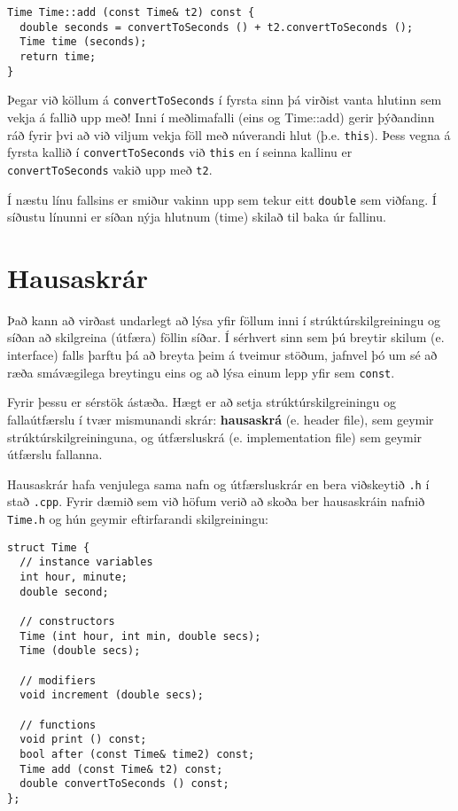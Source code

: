 \begin{verbatim}
Time Time::add (const Time& t2) const {
  double seconds = convertToSeconds () + t2.convertToSeconds ();
  Time time (seconds);
  return time;
}
\end{verbatim}
%
Þegar við köllum á {\tt convertToSeconds} í fyrsta sinn þá virðist vanta hlutinn sem vekja á fallið upp með!
Inni í meðlimafalli (eins og Time::add) gerir þýðandinn ráð fyrir þvi að við viljum vekja föll með núverandi hlut (þ.e. {\tt this}). 
Þess vegna á fyrsta kallið í {\tt convertToSeconds} við {\tt this} en í seinna kallinu er {\tt convertToSeconds} vakið upp með {\tt t2}.

Í næstu línu fallsins er smiður vakinn upp sem tekur eitt {\tt double} sem viðfang.
Í síðustu línunni er síðan nýja hlutnum (time) skilað til baka úr fallinu.

\section {Hausaskrár}

Það kann að virðast undarlegt að lýsa yfir föllum inni í strúktúrskilgreiningu og síðan að skilgreina (útfæra) föllin síðar.
Í sérhvert sinn sem þú breytir skilum (e. interface) falls þarftu þá að breyta þeim á tveimur stöðum, 
jafnvel þó um sé að ræða smávægilega breytingu eins og að lýsa einum lepp yfir sem {\tt const}.

Fyrir þessu er sérstök ástæða. Hægt er að setja strúktúrskilgreiningu og fallaútfærslu í tvær mismunandi skrár:
{\bf hausaskrá} (e. header file), sem geymir strúktúrskilgreininguna, og útfærsluskrá (e. implementation file) sem geymir útfærslu fallanna.

Hausaskrár hafa venjulega sama nafn og útfærsluskrár en bera viðskeytið {\tt .h} í stað {\tt .cpp}.
Fyrir dæmið sem við höfum verið að skoða ber hausaskráin nafnið {\tt Time.h} og hún geymir eftirfarandi skilgreiningu:

\begin{verbatim}
struct Time {
  // instance variables
  int hour, minute;
  double second;

  // constructors
  Time (int hour, int min, double secs);
  Time (double secs);

  // modifiers
  void increment (double secs);

  // functions
  void print () const;
  bool after (const Time& time2) const;
  Time add (const Time& t2) const;
  double convertToSeconds () const;
};
\end{verbatim}
%

